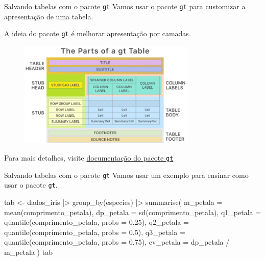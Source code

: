 \documentclass[
  10pt,
  ignorenonframetext,
]{beamer}
\newenvironment{Shaded}{\begin{snugshade}}{\end{snugshade}}
\newcommand{\AttributeTok}[1]{\textcolor[rgb]{0.40,0.45,0.13}{#1}}
\newcommand{\FloatTok}[1]{\textcolor[rgb]{0.68,0.00,0.00}{#1}}
\newcommand{\FunctionTok}[1]{\textcolor[rgb]{0.28,0.35,0.67}{#1}}
\newcommand{\NormalTok}[1]{\textcolor[rgb]{0.00,0.23,0.31}{#1}}
\newcommand{\OtherTok}[1]{\textcolor[rgb]{0.00,0.23,0.31}{#1}}
\newcommand{\SpecialCharTok}[1]{\textcolor[rgb]{0.37,0.37,0.37}{#1}}
\begin{document}
\begin{frame}[fragile]{Salvando tabelas com o pacote \texttt{gt}}
\protect\hypertarget{salvando-tabelas-com-o-pacote-gt}{}
Vamos usar o pacote \texttt{gt} para customizar a apresentação de uma
tabela.

A ideia do pacote \texttt{gt} é melhorar apresentação por camadas.

\begin{figure}

{\centering \includegraphics[width=0.75\textwidth,height=\textheight]{gt-table.jpeg}

}

\end{figure}

Para mais detalhes, visite \href{https://gt.rstudio.com/}{documentação
do pacote \texttt{gt}}
\end{frame}

\begin{frame}[fragile]{Salvando tabelas com o pacote \texttt{gt}}
\protect\hypertarget{salvando-tabelas-com-o-pacote-gt-1}{}
Vamos usar um exemplo para ensinar como usar o pacote \texttt{gt}.

\small

\begin{Shaded}
\begin{Highlighting}[]
\NormalTok{tab }\OtherTok{\textless{}{-}}\NormalTok{ dados\_iris }\SpecialCharTok{|\textgreater{}}
  \FunctionTok{group\_by}\NormalTok{(especies) }\SpecialCharTok{|\textgreater{}}
  \FunctionTok{summarise}\NormalTok{(}
    \AttributeTok{m\_petala =} \FunctionTok{mean}\NormalTok{(comprimento\_petala),}
    \AttributeTok{dp\_petala =} \FunctionTok{sd}\NormalTok{(comprimento\_petala),}
    \AttributeTok{q1\_petala =} \FunctionTok{quantile}\NormalTok{(comprimento\_petala, }\AttributeTok{probs =} \FloatTok{0.25}\NormalTok{),}
    \AttributeTok{q2\_petala =} \FunctionTok{quantile}\NormalTok{(comprimento\_petala, }\AttributeTok{probs =} \FloatTok{0.5}\NormalTok{),}
    \AttributeTok{q3\_petala =} \FunctionTok{quantile}\NormalTok{(comprimento\_petala, }\AttributeTok{probs =} \FloatTok{0.75}\NormalTok{),}
    \AttributeTok{cv\_petala =}\NormalTok{ dp\_petala }\SpecialCharTok{/}\NormalTok{ m\_petala}
\NormalTok{  )}
\NormalTok{tab}
\end{Highlighting}
\end{Shaded}
\end{frame}
\end{document}
